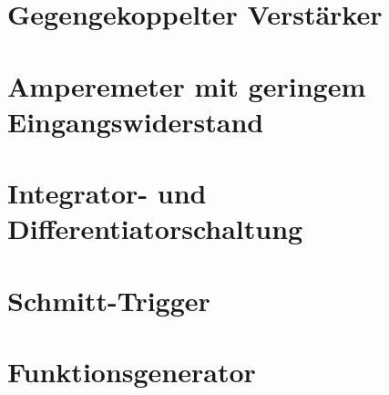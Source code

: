 \section{Gegengekoppelter Verstärker}






\section{Amperemeter mit geringem Eingangswiderstand}

\section{Integrator- und Differentiatorschaltung}










\section{Schmitt-Trigger}

\section{Funktionsgenerator}



